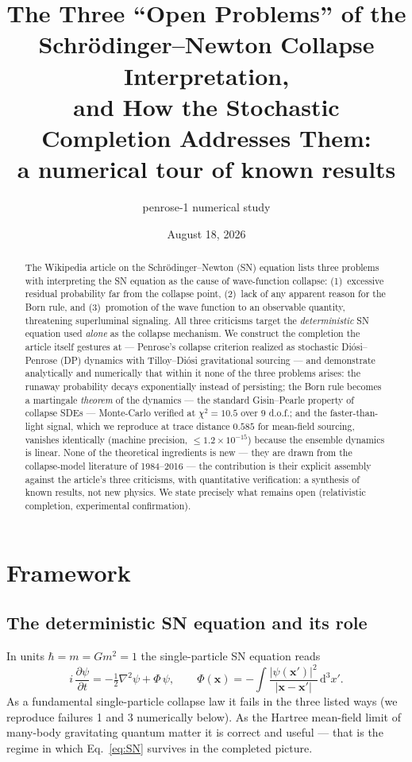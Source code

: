 \documentclass[11pt,a4paper]{article}
\title{The Three ``Open Problems'' of the\\
Schr\"odinger--Newton Collapse Interpretation,\\
and How the Stochastic Completion Addresses Them:\\
{\large a numerical tour of known results}}
\author{penrose-1 numerical study}
\date{August 18, 2026}
\newcommand{\dd}{\mathrm{d}}
\begin{document}
\maketitle

\begin{abstract}
The Wikipedia article on the Schr\"odinger--Newton (SN) equation lists three problems with
interpreting the SN equation as the cause of wave-function collapse: (1)~excessive residual
probability far from the collapse point, (2)~lack of any apparent reason for the Born rule,
and (3)~promotion of the wave function to an observable quantity, threatening superluminal
signaling. All three criticisms target the \emph{deterministic} SN equation used
\emph{alone} as the collapse mechanism. We construct the completion the article itself
gestures at --- Penrose's collapse criterion realized as stochastic Di\'osi--Penrose (DP)
dynamics with Tilloy--Di\'osi gravitational sourcing --- and demonstrate analytically and
numerically that within it none of the three problems arises: the runaway probability decays
exponentially instead of persisting; the Born rule becomes a martingale \emph{theorem} of
the dynamics --- the standard Gisin--Pearle property of collapse SDEs --- Monte-Carlo
verified at $\chi^2 = 10.5$ over $9$ d.o.f.; and the
faster-than-light signal, which we reproduce at trace distance $0.585$ for mean-field
sourcing, vanishes identically (machine precision, $\le 1.2\times10^{-15}$) because the
ensemble dynamics is linear. None of the theoretical ingredients is new --- they are drawn
from the collapse-model literature of 1984--2016 --- the contribution is their explicit
assembly against the article's three criticisms, with quantitative verification: a
synthesis of known results, not new physics. We state
precisely what remains open (relativistic completion, experimental confirmation).
\end{abstract}

\section{Framework}

\subsection{The deterministic SN equation and its role}
In units $\hbar = m = Gm^2 = 1$ the single-particle SN equation reads
\begin{equation}
  i\,\frac{\partial\psi}{\partial t} = -\tfrac12 \nabla^2\psi + \Phi\,\psi,
  \qquad
  \Phi(\mathbf{x}) = -\int \frac{|\psi(\mathbf{x}')|^2}{|\mathbf{x}-\mathbf{x}'|}\,\dd^3x' .
  \label{eq:SN}
\end{equation}
As a fundamental single-particle collapse law it fails in the three listed ways (we
reproduce failures 1 and 3 numerically below). As the Hartree mean-field limit of many-body
gravitating quantum matter it is correct and useful --- that is the regime in which
Eq.~\eqref{eq:SN} survives in the completed picture.
\end{document}
